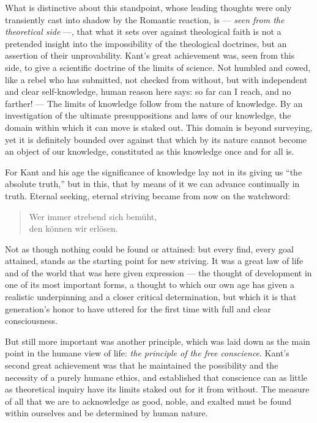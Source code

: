 \documentclass[12pt,a4paper,openany]{book}
\newcommand{\opage}[1]{\marginnote{\footnotesize\textit{[#1]}}}
\begin{document}
What is distinctive about this standpoint, whose
\opage{200}leading thoughts were only
transiently cast into shadow by the Romantic reaction, is --- \emph{seen from the theoretical side}
---, that what it sets over against theological faith is not a
pretended insight into the impossibility of the theological doctrines, but an
assertion of their unprovability. Kant's great achievement was, seen from this
side, to give a scientific doctrine of the limits of science. Not humbled and
cowed, like a rebel who has submitted, not checked from without, but with
independent and clear self-knowledge, human reason here says: so far can I
reach, and no farther! --- The limits of knowledge follow from the nature of
knowledge. By an investigation of the ultimate presuppositions and laws of our
knowledge, the domain within which it can move is staked out. This domain is
beyond surveying, yet it is definitely bounded over against that which by its
nature cannot become an object of our knowledge, constituted as this knowledge
once and for all is.

For Kant and his age the significance of knowledge lay not in its giving us
``the absolute truth,'' but in this, that by means of it we can advance
continually in truth. Eternal seeking, eternal striving became from now on the
watchword:

\begin{verse}
Wer immer strebend sich bemüht, \\
den können wir erlösen.
\end{verse}

Not as though nothing could be found or attained: but every find, every goal
attained, stands as the starting point for new striving. It was a great law of
life and of the world that was here given expression --- the thought of
development in one of its most important forms, a thought to which our own age
has given a realistic underpinning and a closer critical determination, but
which it is that generation's honor to have uttered for the first time with
full and clear consciousness.

But still more important was another principle, which was laid down as the
main point in the humane view of life: \emph{the principle of the free conscience}.
Kant's second great achievement was that he maintained the possibility and the
necessity of a purely humane ethics, and established that conscience can as
little as theoretical inquiry have its limits staked out for it
\opage{201}from without.
The measure of all that we are to acknowledge as good, noble, and exalted must
be found within ourselves and be determined by human nature.
\end{document}
